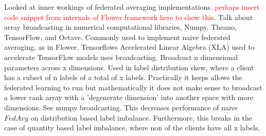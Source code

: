 \documentclass[letterpaper]{article} %
\begin{document}
Looked at inner workings of federated averaging implementations. \textcolor{red}{perhaps insert code snippet from internals of Flower framework here to show this}. Talk about array broadcasting in numerical computational libraries, Numpy, Theano, TensorFlow, and Octave. Commonly used to implement naive federated averaging, as in Flower. Tensorflows Accelerated Linear Algebra (XLA) used to accelerate TensorFlow models uses broadcasting. Broadcast n dimensional parameters across x dimensions. Used in label distribution skew, where a client has a subset of n labels of a total of x labels. Practically it keeps allows the federated learning to run but mathematically it does not make sense to broadcast a lower rank array with a 'degenerate dimension' into another space with more dimensions. See numpy broadcasting. This decreases performance of naive $FedAvg$ on distribution based label imbalance. Furthermore, this breaks in the case of quantity based label imbalance, where non of the clients have all x labels.
\end{document}
